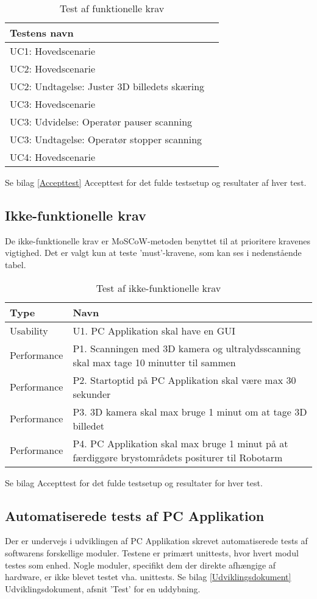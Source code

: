 \begin{table}[htb]
\centering
\begin{tabular}{ | l | p{} | } 
\hline
\textbf{Testens navn} \\\hline
UC1: Hovedscenarie\\\hline 
UC2: Hovedscenarie \\\hline 
UC2: Undtagelse: Juster 3D billedets skæring \\\hline 
UC3: Hovedscenarie \\\hline 
UC3: Udvidelse: Operatør pauser scanning \\\hline 
UC3: Undtagelse: Operatør stopper scanning \\\hline 
UC4: Hovedscenarie \\\hline 
\end{tabular}
\caption{Test af funktionelle krav} 
\end{table}

Se bilag \ref{Accepttest} Accepttest for det fulde testsetup og resultater af hver test. 

\subsection{Ikke-funktionelle krav} 
De ikke-funktionelle krav er MoSCoW-metoden benyttet til at prioritere kravenes vigtighed. Det er valgt kun at teste ’must’-kravene, som kan ses i nedenstående tabel. 

\begin{table}[htb]
\centering
\begin{tabular}{ | l | p{} | }
\hline
\textbf{Type} & \textbf{Navn} \\\hline
Usability & U1. PC Applikation skal have en GUI \\\hline 
Performance & P1. Scanningen med 3D kamera og ultralydsscanning skal max tage 10
minutter til sammen \\\hline 
Performance & P2. Startoptid på PC Applikation skal være max 30 sekunder \\\hline
Performance & P3. 3D kamera skal max bruge 1 minut om at tage 3D billedet \\\hline 
Performance & P4. PC Applikation skal max bruge 1 minut på at færdiggøre brystområdets
positurer til Robotarm \\\hline 
\end{tabular}
\caption{Test af ikke-funktionelle krav}
\end{table}

Se bilag Accepttest for det fulde testsetup og resultater for hver test. 

\subsection{Automatiserede tests af PC Applikation}
Der er undervejs i udviklingen af PC Applikation skrevet automatiserede tests af softwarens forskellige moduler. Testene er primært unittests, hvor hvert modul testes som enhed. Nogle moduler, specifikt dem der direkte afhængige af hardware, er ikke blevet testet vha. unittests. Se bilag \ref{Udviklingsdokument} Udviklingsdokument, afsnit 'Test' for en uddybning.